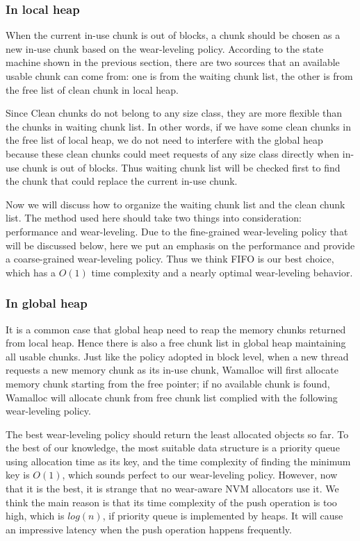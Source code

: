 \documentclass[10pt, conference, compsocconf]{IEEEtran}
\begin{document}
\subsubsection{In local heap}

When the current in-use chunk is out of blocks, 
a chunk should be chosen as a new in-use chunk based on the wear-leveling policy.
According to the state machine shown in the previous section,
there are two sources that an available usable chunk can come from:
one is from the waiting chunk list, the other is from the free list of clean chunk in local heap.

Since Clean chunks do not belong to any size class, they are more flexible than the chunks in waiting chunk list.
In other words, if we have some clean chunks in the free list of local heap, 
we do not need to interfere with the global heap
because these clean chunks could meet requests of any size class directly when in-use chunk is out of blocks.
Thus waiting chunk list will be checked first to find the chunk that could replace the current in-use chunk.

Now we will discuss how to organize the waiting chunk list and the clean chunk list.
The method used here should take two things into consideration:
performance and wear-leveling.
Due to the fine-grained wear-leveling policy that will be discussed below,
here we put an emphasis on the performance and provide a coarse-grained wear-leveling policy.
Thus we think FIFO is our best choice, which has a $O(1)$ time complexity and a nearly optimal wear-leveling behavior.

\subsubsection{In global heap}
It is a common case that global heap need to reap the memory chunks returned from local heap.
Hence there is also a free chunk list in global heap maintaining all usable chunks. 
Just like the policy adopted in block level, 
when a new thread requests a new memory chunk as its in-use chunk,
Wamalloc will first allocate memory chunk starting from the free pointer; 
if no available chunk is found, Wamalloc will allocate chunk from free chunk list complied with the following wear-leveling policy.

The best wear-leveling policy should return the least allocated objects so far. 
To the best of our knowledge, the most suitable data structure is a priority queue using allocation time as its key,
and the time complexity of finding the minimum key is $O(1)$, which sounds perfect to our wear-leveling policy.
However, now that it is the best, it is strange that no wear-aware NVM allocators use it.
We think the main reason is that its time complexity of the push operation is too high, which is $log(n)$, if priority queue is implemented by heaps. 
It will cause an impressive latency when the push operation happens frequently.
\end{document}
